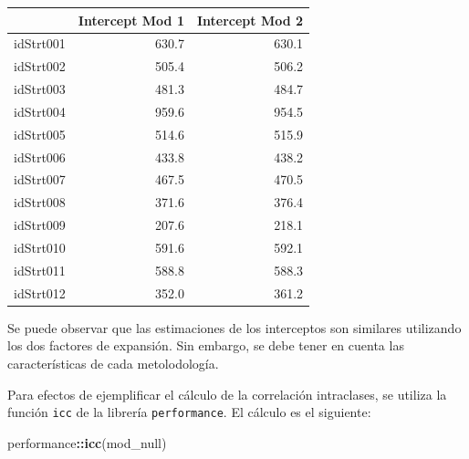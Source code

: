 \documentclass[
  12pt,
]{book}
\newenvironment{Shaded}{\begin{snugshade}}{\end{snugshade}}
\newcommand{\DecValTok}[1]{\textcolor[rgb]{0.00,0.00,0.81}{#1}}
\newcommand{\FunctionTok}[1]{\textcolor[rgb]{0.13,0.29,0.53}{\textbf{#1}}}
\newcommand{\NormalTok}[1]{#1}
\newcommand{\OtherTok}[1]{\textcolor[rgb]{0.56,0.35,0.01}{#1}}
\newcommand{\SpecialCharTok}[1]{\textcolor[rgb]{0.81,0.36,0.00}{\textbf{#1}}}
\newcommand{\StringTok}[1]{\textcolor[rgb]{0.31,0.60,0.02}{#1}}
\begin{document}
\begin{Shaded}
\end{Shaded}

\begin{tabular}{l|r|r}
\hline
  & Intercept Mod 1 & Intercept Mod 2\\
\hline
idStrt001 & 630.7 & 630.1\\
\hline
idStrt002 & 505.4 & 506.2\\
\hline
idStrt003 & 481.3 & 484.7\\
\hline
idStrt004 & 959.6 & 954.5\\
\hline
idStrt005 & 514.6 & 515.9\\
\hline
idStrt006 & 433.8 & 438.2\\
\hline
idStrt007 & 467.5 & 470.5\\
\hline
idStrt008 & 371.6 & 376.4\\
\hline
idStrt009 & 207.6 & 218.1\\
\hline
idStrt010 & 591.6 & 592.1\\
\hline
idStrt011 & 588.8 & 588.3\\
\hline
idStrt012 & 352.0 & 361.2\\
\hline
\end{tabular}

Se puede observar que las estimaciones de los interceptos son similares utilizando los dos factores de expansión. Sin embargo, se debe tener en cuenta las características de cada metolodología.

Para efectos de ejemplificar el cálculo de la correlación intraclases, se utiliza la función \texttt{icc} de la librería \texttt{performance}. El cálculo es el siguiente:

\begin{Shaded}
\begin{Highlighting}[]
\NormalTok{performance}\SpecialCharTok{::}\FunctionTok{icc}\NormalTok{(mod\_null)}
\end{Highlighting}
\end{Shaded}
\end{document}
